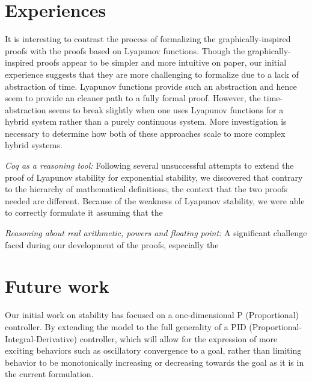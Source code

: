 \documentclass[preprint,nocopyrightspace]{sigplanconf}
\begin{document}
\section {Experiences}

It is interesting to contrast the process of formalizing the graphically-inspired proofs with the proofs based on Lyapunov functions.
Though the graphically-inspired proofs appear to be simpler and more intuitive on paper, our initial experience suggests that they are more challenging to formalize due to a lack of abstraction of time.
Lyapunov functions provide such an abstraction and hence seem to provide an cleaner path to a fully formal proof.
However, the time-abstraction seems to break slightly when one uses Lyapunov functions for a hybrid system rather than a purely continuous system.
More investigation is necessary to determine how both of these approaches scale to more complex hybrid systems.

\emph{Coq as a reasoning tool: } Following several unsuccessful attempts to extend the proof of Lyapunov stability for exponential stability, we discovered that contrary to the hierarchy of mathematical definitions, the context that the two proofs needed are different. Because of the weakness of Lyapunov stability, we were able to correctly formulate it assuming that the






\emph{Reasoning about real arithmetic, powers and floating point: }
A significant challenge faced during our development of the proofs, especially the

\section{Future work}

Our initial work on stability has focused on a one-dimensional P (Proportional) controller. By extending the model to the full generality of a PID (Proportional-Integral-Derivative) controller, which will allow for the expression of more exciting behaviors such as oscillatory convergence to a goal, rather than limiting behavior to be monotonically increasing or decreasing towards the goal as it is in the current formulation.
\end{document}
